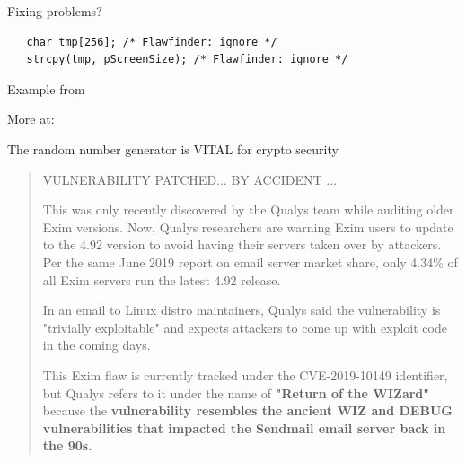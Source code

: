 \documentclass[Screen16to9,17pt]{foils}
\begin{document}
Fixing problems?\\
\begin{verbatim}
   char tmp[256]; /* Flawfinder: ignore */
   strcpy(tmp, pScreenSize); /* Flawfinder: ignore */
\end{verbatim}
Example from 


More at: {\footnotesize
{}}



\centerline{The random number generator is VITAL for crypto security}



\begin{quote}
  VULNERABILITY PATCHED... BY ACCIDENT
...

This was only recently discovered by the Qualys team while auditing older Exim versions. Now, Qualys researchers are warning Exim users to update to the 4.92
version to avoid having their servers taken over by attackers. Per the same June 2019 report on email server market share, only 4.34\% of all Exim servers run
the latest 4.92 release.

In an email to Linux distro maintainers, Qualys said the vulnerability is "trivially exploitable" and expects attackers to come up with exploit code in the
coming days.

This Exim flaw is currently tracked under the CVE-2019-10149 identifier, but Qualys refers to it under the name of \textbf{"Return of the WIZard"} because the
\textbf{vulnerability resembles the ancient WIZ and DEBUG vulnerabilities that impacted the Sendmail email server back in the 90s.}
\end{quote}
\end{document}
